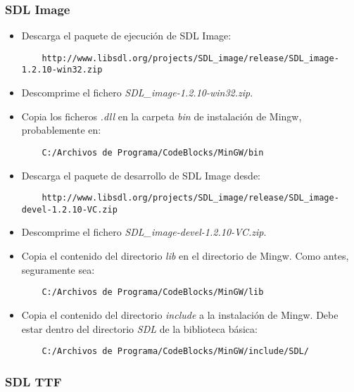 \documentclass[16pt,spanish]{article}
\begin{document}
\subsubsection{SDL Image}

\begin{itemize}
	\item Descarga el paquete de ejecución de SDL Image:
	\begin{verbatim}
	http://www.libsdl.org/projects/SDL_image/release/SDL_image-1.2.10-win32.zip
	\end{verbatim}
	\item Descomprime el fichero \emph{SDL\_image-1.2.10-win32.zip}.
	\item Copia los ficheros \emph{.dll} en la carpeta \emph{bin} de instalación
	de Mingw, probablemente en:
	\begin{verbatim}
	C:/Archivos de Programa/CodeBlocks/MinGW/bin
	\end{verbatim}
	\item Descarga el paquete de desarrollo de SDL Image desde:
	\begin{verbatim}
	http://www.libsdl.org/projects/SDL_image/release/SDL_image-devel-1.2.10-VC.zip
	\end{verbatim}
	\item Descomprime el fichero \emph{SDL\_image-devel-1.2.10-VC.zip}.
	\item Copia el contenido del directorio \emph{lib} en el directorio
	de Mingw. Como antes, seguramente sea:
	\begin{verbatim}
	C:/Archivos de Programa/CodeBlocks/MinGW/lib
	\end{verbatim}
	\item Copia el contenido del directorio \emph{include} a la instalación de Mingw.
	Debe estar dentro del directorio \emph{SDL} de la biblioteca básica:
	\begin{verbatim}
	C:/Archivos de Programa/CodeBlocks/MinGW/include/SDL/
	\end{verbatim}
\end{itemize}

\subsubsection{SDL TTF}
\end{document}
